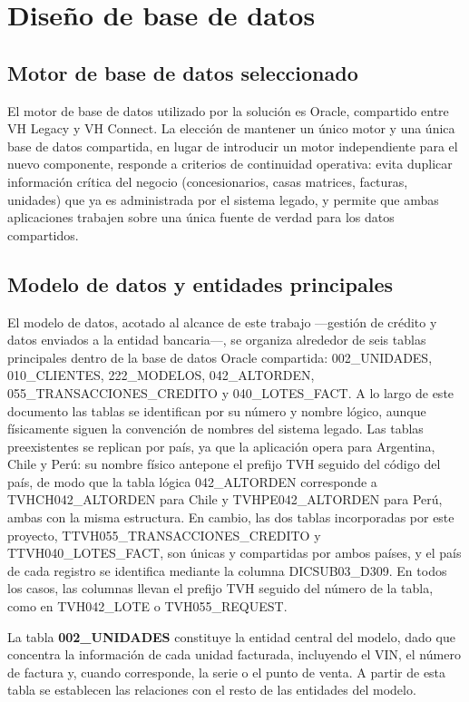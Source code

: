 \section{Diseño de base de datos}

\subsection{Motor de base de datos seleccionado}

El motor de base de datos utilizado por la solución es Oracle, compartido entre VH Legacy y VH Connect. La elección de mantener un único motor y una única base de datos compartida, en lugar de introducir un motor independiente para el nuevo componente, responde a criterios de continuidad operativa: evita duplicar información crítica del negocio (concesionarios, casas matrices, facturas, unidades) que ya es administrada por el sistema legado, y permite que ambas aplicaciones trabajen sobre una única fuente de verdad para los datos compartidos.

\subsection{Modelo de datos y entidades principales}

El modelo de datos, acotado al alcance de este trabajo ---gestión de crédito y datos enviados a la entidad bancaria---, se organiza alrededor de seis tablas principales dentro de la base de datos Oracle compartida: 002\_UNIDADES, 010\_CLIENTES, 222\_MODELOS, 042\_ALTORDEN, 055\_TRANSACCIONES\_CREDITO y 040\_LOTES\_FACT. A lo largo de este documento las tablas se identifican por su número y nombre lógico, aunque físicamente siguen la convención de nombres del sistema legado. Las tablas preexistentes se replican por país, ya que la aplicación opera para Argentina, Chile y Perú: su nombre físico antepone el prefijo TVH seguido del código del país, de modo que la tabla lógica 042\_ALTORDEN corresponde a TVHCH042\_ALTORDEN para Chile y TVHPE042\_ALTORDEN para Perú, ambas con la misma estructura. En cambio, las dos tablas incorporadas por este proyecto, TTVH055\_TRANSACCIONES\_CREDITO y TTVH040\_LOTES\_FACT, son únicas y compartidas por ambos países, y el país de cada registro se identifica mediante la columna DICSUB03\_D309. En todos los casos, las columnas llevan el prefijo TVH seguido del número de la tabla, como en TVH042\_LOTE o TVH055\_REQUEST.

La tabla \textbf{002\_UNIDADES} constituye la entidad central del modelo, dado que concentra la información de cada unidad facturada, incluyendo el VIN, el número de factura y, cuando corresponde, la serie o el punto de venta. A partir de esta tabla se establecen las relaciones con el resto de las entidades del modelo.

